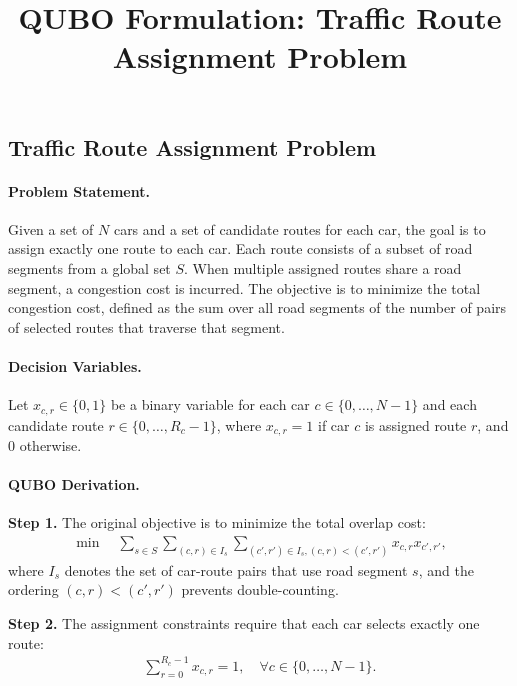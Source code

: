 \documentclass[12pt]{article}
\title{QUBO Formulation: Traffic Route Assignment Problem}
\date{}
\begin{document}
\maketitle

\subsection*{Traffic Route Assignment Problem}

\paragraph{Problem Statement.}
Given a set of $N$ cars and a set of candidate routes for each car, the goal is to assign exactly one route to each car. Each route consists of a subset of road segments from a global set $S$. When multiple assigned routes share a road segment, a congestion cost is incurred. The objective is to minimize the total congestion cost, defined as the sum over all road segments of the number of pairs of selected routes that traverse that segment.

\paragraph{Decision Variables.}
Let $x_{c,r} \in \{0,1\}$ be a binary variable for each car $c \in \{0, \dots, N-1\}$ and each candidate route $r \in \{0, \dots, R_c-1\}$, where $x_{c,r} = 1$ if car $c$ is assigned route $r$, and $0$ otherwise.

\paragraph{QUBO Derivation.}
\textbf{Step 1.} The original objective is to minimize the total overlap cost:
\begin{align}
  \min \quad \sum_{s \in S} \sum_{(c,r) \in I_s} \sum_{(c',r') \in I_s, (c,r) < (c',r')} x_{c,r} x_{c',r'},
\end{align}
where $I_s$ denotes the set of car-route pairs that use road segment $s$, and the ordering $(c,r) < (c',r')$ prevents double-counting.

\textbf{Step 2.} The assignment constraints require that each car selects exactly one route:
\begin{align}
  \sum_{r=0}^{R_c-1} x_{c,r} = 1, \quad \forall c \in \{0, \dots, N-1\}.
\end{align}
\end{document}

